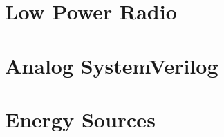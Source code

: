 \documentclass[11pt,twoside,openright]{book}
\begin{document}
\chapter{Low Power Radio}


\chapter{Analog SystemVerilog}


\chapter{Energy Sources}


%


%


\backmatter
\end{document}
